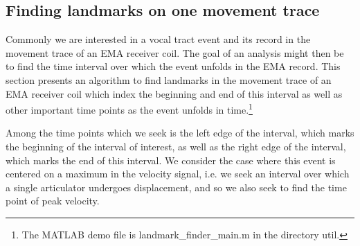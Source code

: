 \documentclass[a4paper, 12pt]{article}
\begin{document}
\subsection{Finding landmarks on one movement trace}
\label{subsec:oneMT}

Commonly we are interested in a vocal tract event and its record in the movement trace of an EMA receiver coil. The goal of an analysis might then be to find the time interval over which the event unfolds in the EMA record. This section presents an algorithm to find landmarks in the movement trace of an EMA receiver coil which index the beginning and end of this interval as well as other important time points as the event unfolds in time.\footnote{The MATLAB demo file is landmark\_finder\_main.m in the directory util.}

Among the time points which we seek is the left edge of the interval, which marks the beginning of the interval of interest, as well as the right edge of the interval, which marks the end of this interval. We consider the case where this event is centered on a maximum in the velocity signal, i.e. we seek an interval over which a single articulator undergoes displacement, and so we also seek to find the time point of peak velocity.
\end{document}
